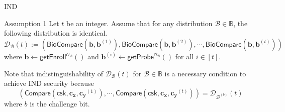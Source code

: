 \begin{frame}{IND}

\begin{block}{Assumption 1}
Let $t$ be an integer. Assume that for any distribution $\mathcal{B} \in \mathbb{B}$, the following distribution is identical.
\[
	\mathcal{D}_\mathcal{B}(t) := \left( \textsf{BioCompare}(\mathbf{b}, \mathbf{b}^{(1)}), \textsf{BioCompare}(\mathbf{b}, \mathbf{b}^{(2)}), \cdots, \textsf{BioCompare}(\mathbf{b}, \mathbf{b}^{(t)}) \right)
\]
where $\mathbf{b} \gets \textsf{getEnroll}^{\mathcal{O}_\mathcal{B}}()$ and $ \mathbf{b}^{(i)} \gets \textsf{getProbe}^{\mathcal{O}_\mathcal{B}}()$ for all $i \in [t]$.

\end{block}
\pause

Note that indistinguishability of $\mathcal{D}_\mathcal{B}(t)$ for $\mathcal{B} \in \mathbb{B}$ is a necessary condition to achieve IND security because
\[
	\left( \textsf{Compare}(\textsf{csk}, \mathbf{c_x}, \mathbf{c_y}^{(1)}), \cdots, \textsf{Compare}(\textsf{csk}, \mathbf{c_x}, \mathbf{c_y}^{(t)}) \right) = \mathcal{D}_{\mathcal{B}^{(b)}}(t)
\]
where $b$ is the challenge bit.


\end{frame}


